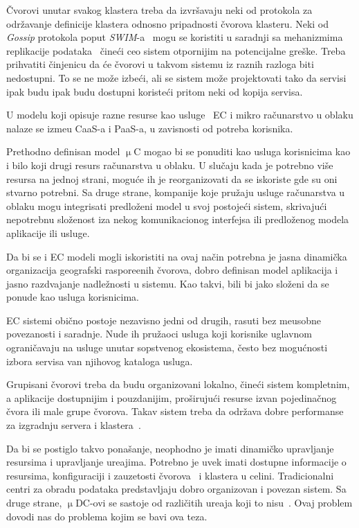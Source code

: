 \v Cvorovi unutar svakog klastera treba da izvr\v savaju neki od protokola za odr\v zavanje definicije klastera odnosno pripadnosti \v cvorova klasteru. Neki od \textit{Gossip} protokola poput \textit{SWIM}-a~\cite{DasGM02} mogu se koristiti u saradnji sa mehanizmima replikacije podataka~\cite {LiBCL20, CauCBFCEB16, CRDTS_Nuno} \v cine\'ci ceo sistem otpornijim na potencijalne gre\v ske. Treba prihvatiti \v cinjenicu da \'ce \v cvorovi u takvom sistemu iz raznih razloga biti nedostupni. To se ne mo\v ze izbe\'ci, ali se sistem mo\v ze projektovati tako da servisi ipak budu ipak budu dostupni koriste\'ci pritom neki od kopija servisa.

U modelu koji opisuje razne resurse kao usluge~\cite{DuanFZSNH15} EC i mikro ra\v cunarstvo u oblaku nalaze se izme\dj u CaaS-a i PaaS-a, u zavisnosti od potreba korisnika.

Prethodno definisan model $\upmu$C mogao bi se ponuditi kao usluga korisnicima kao i bilo koji drugi resurs ra\v cunarstva u oblaku. U slu\v caju kada je potrebno vi\v se resursa na jednoj strani, mogu\'ce ih je reorganizovati da se iskoriste gde su oni stvarno potrebni. Sa druge strane, kompanije koje pru\v zaju usluge ra\v cunarstva u oblaku mogu integrisati predlo\v zeni model u svoj postoje\'ci sistem, skrivaju\'ci nepotrebnu slo\v zenost iza nekog komunikacionog interfejsa ili predlo\v zenog modela aplikacije ili usluge.

Da bi se i EC modeli mogli iskoristiti na ovaj na\v cin potrebna je jasna dinami\v cka organizacija geografski raspore\dj enih \v cvorova, dobro definisan model aplikacija i jasno razdvajanje nadle\v znosti u sistemu. Kao takvi, bili bi jako slo\v zeni da se ponude kao usluga korisnicima. 

EC sistemi obi\v cno postoje nezavisno jedni od drugih, rasuti bez me\dj usobne povezanosti i saradnje. Nude ih pru\v zaoci usluga koji korisnike uglavnom ograni\v cavaju na usluge unutar sopstvenog ekosistema, \v cesto bez mogu\'cnosti izbora servisa van njihovog kataloga usluga. 

Grupisani čvorovi treba da budu organizovani lokalno, \v cine\'ci sistem kompletnim, a aplikacije dostupnijim i pouzdanijim, pro\v siruju\'ci resurse izvan pojedina\v cnog \v cvora ili male grupe \v cvorova. Takav sistem treba da odr\v zava dobre performanse za izgradnju servera i klastera~\cite{ArocaG12}.

Da bi se postiglo takvo pona\v sanje, neophodno je imati dinami\v cko upravljanje resursima i upravljanje ure\dj ajima. Potrebno je uvek imati dostupne informacije o resursima, konfiguraciji i zauzetosti \v cvorova~\cite{GubbiBMP13, WangZZWYW17} i klastera u celini. Tradicionalni centri za obradu podataka predstavljaju dobro organizovan i povezan sistem. Sa druge strane, $\upmu$DC-ovi se sastoje od razli\v citih ure\dj aja koji to nisu~\cite{JiangCGZW19}. Ovaj problem dovodi nas do problema kojim se bavi ova teza.

